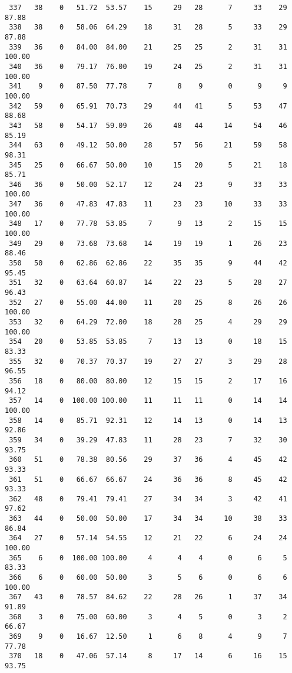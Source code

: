 \begin{verbatim}
 337   38    0   51.72  53.57    15     29   28      7     33    29    87.88
 338   38    0   58.06  64.29    18     31   28      5     33    29    87.88
 339   36    0   84.00  84.00    21     25   25      2     31    31   100.00
 340   36    0   79.17  76.00    19     24   25      2     31    31   100.00
 341    9    0   87.50  77.78     7      8    9      0      9     9   100.00
 342   59    0   65.91  70.73    29     44   41      5     53    47    88.68
 343   58    0   54.17  59.09    26     48   44     14     54    46    85.19
 344   63    0   49.12  50.00    28     57   56     21     59    58    98.31
 345   25    0   66.67  50.00    10     15   20      5     21    18    85.71
 346   36    0   50.00  52.17    12     24   23      9     33    33   100.00
 347   36    0   47.83  47.83    11     23   23     10     33    33   100.00
 348   17    0   77.78  53.85     7      9   13      2     15    15   100.00
 349   29    0   73.68  73.68    14     19   19      1     26    23    88.46
 350   50    0   62.86  62.86    22     35   35      9     44    42    95.45
 351   32    0   63.64  60.87    14     22   23      5     28    27    96.43
 352   27    0   55.00  44.00    11     20   25      8     26    26   100.00
 353   32    0   64.29  72.00    18     28   25      4     29    29   100.00
 354   20    0   53.85  53.85     7     13   13      0     18    15    83.33
 355   32    0   70.37  70.37    19     27   27      3     29    28    96.55
 356   18    0   80.00  80.00    12     15   15      2     17    16    94.12
 357   14    0  100.00 100.00    11     11   11      0     14    14   100.00
 358   14    0   85.71  92.31    12     14   13      0     14    13    92.86
 359   34    0   39.29  47.83    11     28   23      7     32    30    93.75
 360   51    0   78.38  80.56    29     37   36      4     45    42    93.33
 361   51    0   66.67  66.67    24     36   36      8     45    42    93.33
 362   48    0   79.41  79.41    27     34   34      3     42    41    97.62
 363   44    0   50.00  50.00    17     34   34     10     38    33    86.84
 364   27    0   57.14  54.55    12     21   22      6     24    24   100.00
 365    6    0  100.00 100.00     4      4    4      0      6     5    83.33
 366    6    0   60.00  50.00     3      5    6      0      6     6   100.00
 367   43    0   78.57  84.62    22     28   26      1     37    34    91.89
 368    3    0   75.00  60.00     3      4    5      0      3     2    66.67
 369    9    0   16.67  12.50     1      6    8      4      9     7    77.78
 370   18    0   47.06  57.14     8     17   14      6     16    15    93.75

\end{verbatim}
